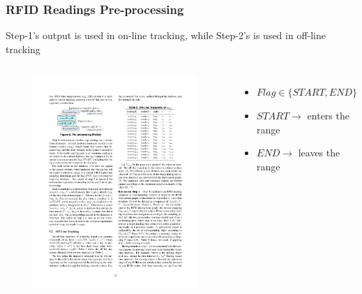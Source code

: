 
\begin{frame}
\frametitle{RFID Readings Pre-processing}

  \small{Step-1's output is used in on-line tracking, while Step-2's is used in off-line tracking}

  \begin{columns}[c]

    \begin{figure}[tb]
      \includegraphics[width=\columnwidth]{figures/2-1/2-1-8.pdf}
    \end{figure}

    \begin{itemize}
        \item $Flag \in \{ START, END \}$
        \item $START \rightarrow$ \textrm{enters the range}
        \item $END \rightarrow$ \textrm{leaves the range}
    \end{itemize}

  \end{columns}

\end{frame}

